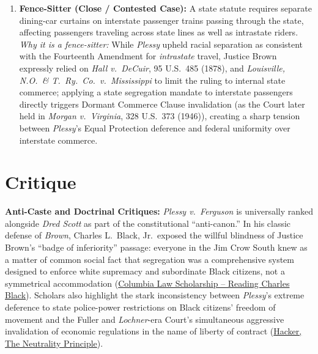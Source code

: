 \documentclass[12pt]{article}
\begin{document}
\begin{enumerate}
\item \textbf{Fence-Sitter (Close / Contested Case):} A state statute requires separate dining-car curtains on interstate passenger trains passing through the state, affecting passengers traveling across state lines as well as intrastate riders. \textit{Why it is a fence-sitter:} While \textit{Plessy} upheld racial separation as consistent with the Fourteenth Amendment for \textit{intrastate} travel, Justice Brown expressly relied on \textit{Hall v.\ DeCuir}, 95 U.S.\ 485 (1878), and \textit{Louisville, N.O.\ \& T.\ Ry.\ Co.\ v.\ Mississippi} to limit the ruling to internal state commerce; applying a state segregation mandate to interstate passengers directly triggers Dormant Commerce Clause invalidation (as the Court later held in \textit{Morgan v.\ Virginia}, 328 U.S.\ 373 (1946)), creating a sharp tension between \textit{Plessy}'s Equal Protection deference and federal uniformity over interstate commerce.
\end{enumerate}

\section{Critique}

\textbf{Anti-Caste and Doctrinal Critiques:} \textit{Plessy v.\ Ferguson} is universally ranked alongside \textit{Dred Scott} as part of the constitutional ``anti-canon.'' In his classic defense of \textit{Brown}, Charles L.\ Black, Jr.\ exposed the willful blindness of Justice Brown's ``badge of inferiority'' passage: everyone in the Jim Crow South knew as a matter of common social fact that segregation was a comprehensive system designed to enforce white supremacy and subordinate Black citizens, not a symmetrical accommodation (\href{https://scholarship.law.columbia.edu/cgi/viewcontent.cgi?article=3132&context=faculty_scholarship}{Columbia Law Scholarship -- Reading Charles Black}). Scholars also highlight the stark inconsistency between \textit{Plessy}'s extreme deference to state police-power restrictions on Black citizens' freedom of movement and the Fuller and \textit{Lochner}-era Court's simultaneous aggressive invalidation of economic regulations in the name of liberty of contract (\href{https://scholarworks.indianapolis.iu.edu/bitstream/1805/5526/1/hacker-2005-the-neutrality.pdf}{Hacker, The Neutrality Principle}).
\end{document}
